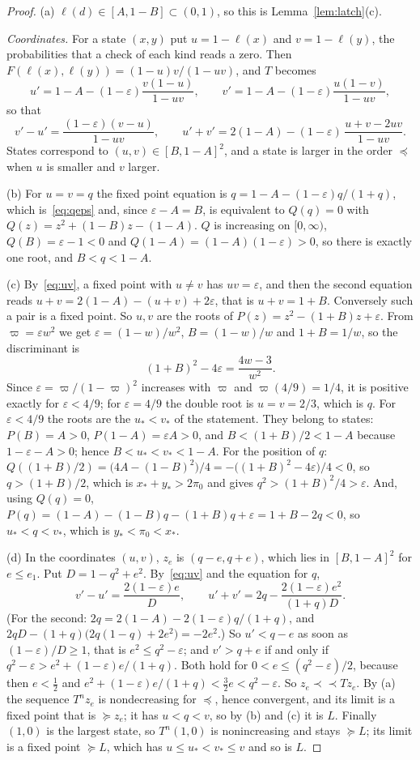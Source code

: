 \documentclass[11pt]{amsart}
\theoremstyle{definition}
\theoremstyle{remark}
\newcommand{\eps}{\varepsilon}
\begin{document}
\begin{proof}
(a) $\ell(d)\in[A,1-B]\subset(0,1)$, so this is Lemma~\ref{lem:latch}(c).

\emph{Coordinates.} For a state $(x,y)$ put $u=1-\ell(x)$ and $v=1-\ell(y)$, the probabilities
that a check of each kind reads a zero. Then $F(\ell(x),\ell(y))=(1-u)v/(1-uv)$, and $T$ becomes
\[
u'=1-A-(1-\eps)\frac{v(1-u)}{1-uv},\qquad v'=1-A-(1-\eps)\frac{u(1-v)}{1-uv},
\]
so that
\begin{equation}\label{eq:uv}
v'-u'=\frac{(1-\eps)(v-u)}{1-uv},\qquad u'+v'=2(1-A)-(1-\eps)\,\frac{u+v-2uv}{1-uv}.
\end{equation}
States correspond to $(u,v)\in[B,1-A]^2$, and a state is larger in the order $\preceq$ when $u$
is smaller and $v$ larger.

(b) For $u=v=q$ the fixed point equation is $q=1-A-(1-\eps)q/(1+q)$, which is~\eqref{eq:qeps}
and, since $\eps-A=B$, is equivalent to $Q(q)=0$ with $Q(z)=z^2+(1-B)z-(1-A)$. $Q$ is increasing
on $[0,\infty)$, $Q(B)=\eps-1<0$ and $Q(1-A)=(1-A)(1-\eps)>0$, so there is exactly one root, and
$B<q<1-A$.

(c) By~\eqref{eq:uv}, a fixed point with $u\ne v$ has $uv=\eps$, and then the second equation
reads $u+v=2(1-A)-(u+v)+2\eps$, that is $u+v=1+B$. Conversely such a pair is a fixed point. So
$u,v$ are the roots of $P(z)=z^2-(1+B)z+\eps$. From $\varpi=\eps w^2$ we get $\eps=(1-w)/w^2$,
$B=(1-w)/w$ and $1+B=1/w$, so the discriminant is
\[
(1+B)^2-4\eps=\frac{4w-3}{w^2}.
\]
Since $\eps=\varpi/(1-\varpi)^2$ increases with $\varpi$ and $\varpi(4/9)=1/4$, it is positive
exactly for $\eps<4/9$; for $\eps=4/9$ the double root is $u=v=2/3$, which is $q$. For $\eps<4/9$
the roots are the $u_*<v_*$ of the statement. They belong to states: $P(B)=A>0$,
$P(1-A)=\eps A>0$, and $B<(1+B)/2<1-A$ because $1-\eps-A>0$; hence $B<u_*<v_*<1-A$. For the
position of $q$: $Q((1+B)/2)=\bigl(4A-(1-B)^2\bigr)/4=-\bigl((1+B)^2-4\eps\bigr)/4<0$, so
$q>(1+B)/2$, which is $x_*+y_*>2\pi_0$ and gives $q^2>(1+B)^2/4>\eps$. And, using $Q(q)=0$,
$P(q)=(1-A)-(1-B)q-(1+B)q+\eps=1+B-2q<0$, so $u_*<q<v_*$, which is $y_*<\pi_0<x_*$.

(d) In the coordinates $(u,v)$, $z_e$ is $(q-e,q+e)$, which lies in $[B,1-A]^2$ for $e\le e_1$. Put $D=1-q^2+e^2$. By~\eqref{eq:uv} and the
equation for $q$,
\[
v'-u'=\frac{2(1-\eps)e}{D},\qquad u'+v'=2q-\frac{2(1-\eps)e^2}{(1+q)D} .
\]
(For the second: $2q=2(1-A)-2(1-\eps)q/(1+q)$, and
$2qD-(1+q)\bigl(2q(1-q)+2e^2\bigr)=-2e^2$.) So $u'<q-e$ as soon as $(1-\eps)/D\ge1$, that is
$e^2\le q^2-\eps$; and $v'>q+e$ if and only if $q^2-\eps>e^2+(1-\eps)e/(1+q)$. Both hold for
$0<e\le(q^2-\eps)/2$, because then $e<\frac12$ and $e^2+(1-\eps)e/(1+q)<\frac32e<q^2-\eps$. So
$z_e\prec\!\!\prec Tz_e$. By (a) the sequence $T^nz_e$ is nondecreasing for $\preceq$, hence
convergent, and its limit is a fixed point that is $\succeq z_e$; it has $u<q<v$, so by (b) and (c)
it is $L$. Finally $(1,0)$ is the largest state, so $T^n(1,0)$ is nonincreasing and stays
$\succeq L$; its limit is a fixed point $\succeq L$, which has $u\le u_*<v_*\le v$ and so is $L$.
\end{proof}
\end{document}
